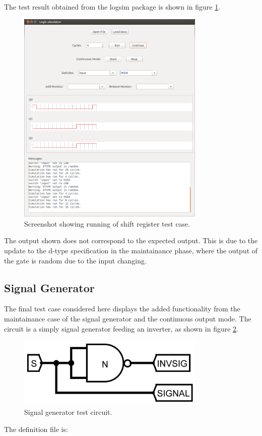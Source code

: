 \documentclass[a4paper,10pt]{article}  %
\begin{document}
The test result obtained from the logsim package is shown in figure
\ref{fig:testsrss}.
\begin{figure}[!htb]
  \begin{center}
    \includegraphics[width=0.8\textwidth]{shift_register_screenshot.png}
  \end{center}
  \caption{Screenshot showing running of shift register test case.}
  \label{fig:testsrss}
\end{figure}
The output shown does not correspond to the expected output. This is
due to the update to the d-type specification in the maintainance
phase, where the output of the gate is random due to the input changing.

\subsection{Signal Generator}

The final test case considered here displays the added functionality
from the maintainance case of the signal generator and the continuous
output mode. The circuit is a simply signal generator feeding an
inverter, as shown in figure \ref{fig:testsgcct}.
\begin{figure}[!htb]
  \begin{center}
    \includegraphics[width=0.8\textwidth]{siggen_schem.png}
  \end{center}
  \caption{Signal generator test circuit.}
  \label{fig:testsgcct}
\end{figure}
The definition file is:

\end{document}
